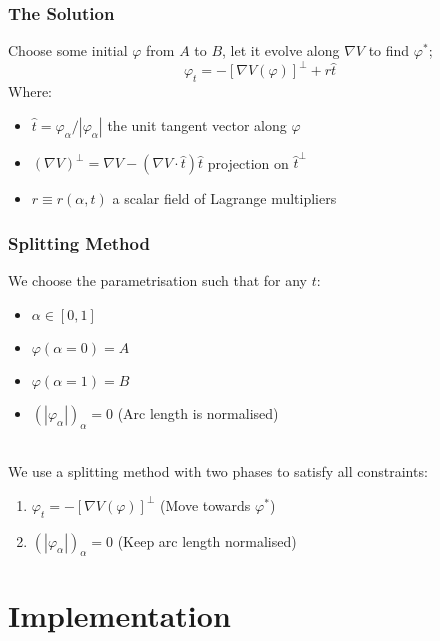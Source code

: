 \documentclass{beamer}
\renewcommand{\phi}{\varphi}
\renewcommand{\(}{\left(}
\renewcommand{\)}{\right)}
\begin{document}
\begin{frame}
\frametitle{The Solution}
Choose some initial $\phi$ from $A$ to $B$, let it evolve along $\nabla V$ to find $\phi^*$;
$$\phi_t=-[\nabla V(\phi)]^\bot+r\hat t$$
Where:
\begin{itemize}
\item $\hat t = {\phi_\alpha}/{|\phi_\alpha|}$\hspace{2em} the unit tangent vector along $\phi$
\item $(\nabla V)^\bot = \nabla V - (\nabla V \cdot \hat t)\hat t$\hspace{2em}  projection on $\hat t^\bot$ 
\item $r \equiv r(\alpha, t)$ \hspace{2em}a scalar field of Lagrange multipliers%
\end{itemize}
\end{frame}

\begin{frame}
\frametitle{Splitting Method}
We choose the parametrisation such that for any $t$:
\begin{itemize}
\item $\alpha\in [0,1]$
\item $\phi(\alpha=0)=A$ 
\item $\phi(\alpha=1)=B$
\item $(|\phi_\alpha|)_\alpha = 0$ \hspace{3em} (Arc length is normalised)
\end{itemize}
~\\
We use a splitting method with two phases to satisfy all constraints: 
\begin{enumerate}
\item $\phi_t=-[\nabla V(\phi)]^\bot$ \hspace{3em} (Move towards $\phi^*$)
\item $(|\phi_\alpha|)_\alpha = 0$ \hspace{3em} (Keep arc length normalised)
\end{enumerate}
\end{frame}

\section{Implementation}%
\end{document}
